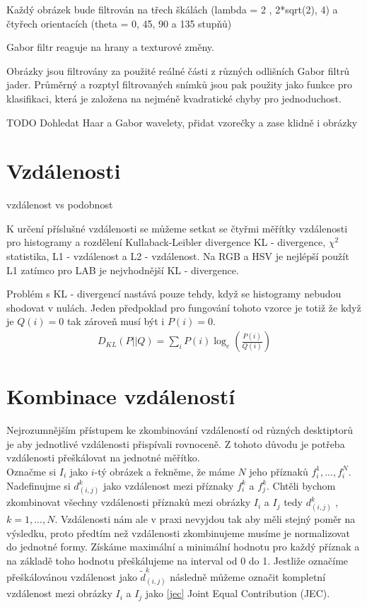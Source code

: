 \documentclass[czech,BP]{thesiskiv}
\begin{document}
Každý obrázek bude filtrován na třech škálách (lambda = 2 , 2*sqrt(2), 4) a čtyřech orientacích (theta = 0, 45, 90 a 135 stupňů)

Gabor filtr reaguje na hrany a texturové změny. 

Obrázky jsou filtrovány za použité reálné části z různých odlišních Gabor filtrů jader. Průměrný a rozptyl filtrovaných snímků jsou pak použity jako funkce pro klasifikaci, která je založena na nejméně kvadratické chyby pro jednoduchost.


TODO Dohledat Haar a Gabor wavelety, přidat vzorečky a zase klidně i obrázky
 
\section{Vzdálenosti}
vzdálenost vs podobnost

 K určení příslušné vzdálenosti se můžeme setkat se čtyřmi měřítky vzdálenosti pro histogramy a rozdělení Kullaback-Leibler divergence KL - divergence, $\chi^2$ statistika, L1 - vzdálenost a L2 - vzdálenost. Na RGB a HSV je nejlépší použít L1 zatímco pro LAB je nejvhodnější KL - divergence. 

Problém s KL - divergencí nastává pouze tehdy, když se histogramy nebudou shodovat v nulách. Jeden předpoklad pro fungování tohoto vzorce je totiž že když je $Q(i) = 0$ tak zároveň musí být i $P(i) = 0$.    
\begin{align}
   \label{kl}  D_{KL} (P || Q) = \sum_{i} P(i) \log_e({\frac{P(i)}{Q(i)}}) 
\end{align}

 

\section{Kombinace vzdáleností}
Nejrozumnějším přístupem ke zkombinování vzdáleností od různých desktiptorů je aby jednotlivé vzdálenosti přispívali rovnoceně. Z tohoto důvodu je potřeba vzdálenosti přeškálovat na jednotné měřítko.\\
Označme si $I_i$ jako $i$-tý obrázek a řekněme, že máme $N$ jeho příznaků $f_i^1, ..., f_i^N$. Nadefinujme si $d_{(i,j)}^k$ jako vzdálenost mezi příznaky $f_i^k$ a $f_j^k$. Chtěli bychom zkombinovat všechny vzdálenosti příznaků mezi obrázky $I_i$ a $I_j$ tedy $d_{(i,j)}^k$ , $k=1, ..., N$.  Vzdálenosti nám ale v praxi nevyjdou tak aby měli stejný poměr na výsledku, proto předtím než vzdálenosti zkombinujeme musíme je normalizovat do jednotné formy. Získáme maximální a minimální hodnotu pro každý příznak a na základě toho hodnotu přeškálujeme na interval od 0 do 1. Jestliže označíme přeškálovánou vzdálenost jako ${\tilde{d}_{(i,j)}^k}$ následně můžeme označit kompletní vzdálenost mezi obrázky $I_i$ a $I_j$ jako \eqref{jec} Joint Equal Contribution (JEC). 
\end{document}
